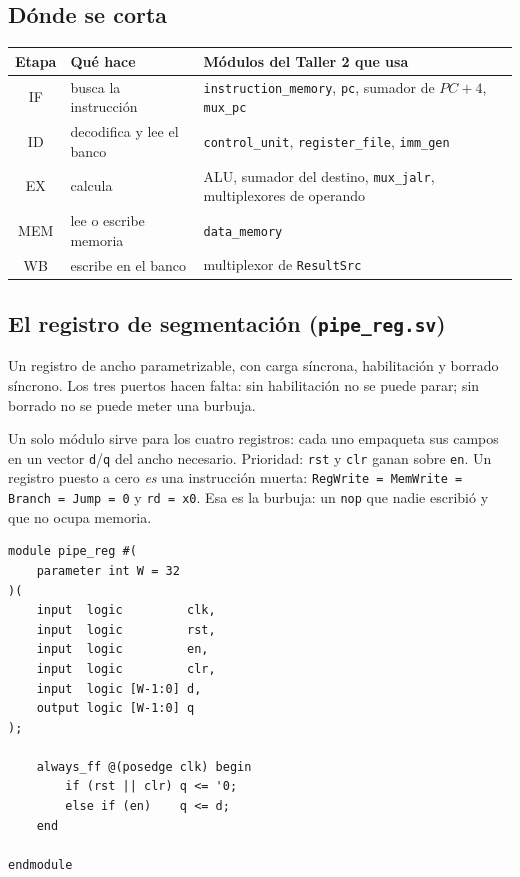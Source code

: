 \documentclass[11pt,letterpaper]{article}
\newcommand{\cod}[1]{\texttt{#1}}
\begin{document}
\subsection{D\'onde se corta}
\begin{center}\small
\begin{tabular}{@{}c l l@{}}
\toprule
\textbf{Etapa} & \textbf{Qu\'e hace} & \textbf{M\'odulos del Taller 2 que usa} \\
\midrule
IF  & busca la instrucci\'on & \cod{instruction\_memory}, \cod{pc}, sumador de $PC+4$, \cod{mux\_pc} \\
ID  & decodifica y lee el banco & \cod{control\_unit}, \cod{register\_file}, \cod{imm\_gen} \\
EX  & calcula & ALU, sumador del destino, \cod{mux\_jalr}, multiplexores de operando \\
MEM & lee o escribe memoria & \cod{data\_memory} \\
WB  & escribe en el banco & multiplexor de \cod{ResultSrc} \\
\bottomrule
\end{tabular}
\end{center}

\subsection{El registro de segmentaci\'on (\cod{pipe\_reg.sv})}
\begin{enunciado}
Un registro de ancho parametrizable, con carga s\'incrona, habilitaci\'on y borrado s\'incrono. Los tres
puertos hacen falta: sin habilitaci\'on no se puede parar; sin borrado no se puede meter una burbuja.
\end{enunciado}
Un solo m\'odulo sirve para los cuatro registros: cada uno empaqueta sus campos en un vector
\cod{d}/\cod{q} del ancho necesario. Prioridad: \cod{rst} y \cod{clr} ganan sobre \cod{en}. Un
registro puesto a cero \emph{es} una instrucci\'on muerta: \cod{RegWrite = MemWrite = Branch = Jump = 0}
y \cod{rd = x0}. Esa es la burbuja: un \cod{nop} que nadie escribi\'o y que no ocupa memoria.

\begin{lstlisting}[language=SV,title={\small\ttfamily rtl/pipe\_reg.sv}]
module pipe_reg #(
    parameter int W = 32
)(
    input  logic         clk,
    input  logic         rst,
    input  logic         en,
    input  logic         clr,
    input  logic [W-1:0] d,
    output logic [W-1:0] q
);

    always_ff @(posedge clk) begin
        if (rst || clr) q <= '0;
        else if (en)    q <= d;
    end

endmodule
\end{lstlisting}
\end{document}

